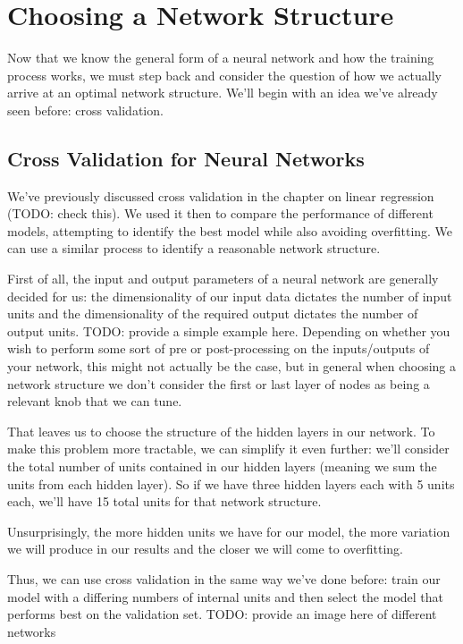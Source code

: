 \section{Choosing a Network Structure}
Now that we know the general form of a neural network and how the training process works, we must step back and consider the question of how we actually arrive at an optimal network structure. We'll begin with an idea we've already seen before: cross validation.

\subsection{Cross Validation for Neural Networks}
We've previously discussed cross validation in the chapter on linear regression (TODO: check this). We used it then to compare the performance of different models, attempting to identify the best model while also avoiding overfitting. We can use a similar process to identify a reasonable network structure.

First of all, the input and output parameters of a neural network are generally decided for us: the dimensionality of our input data dictates the number of input units and the dimensionality of the required output dictates the number of output units. TODO: provide a simple example here. Depending on whether you wish to perform some sort of pre or post-processing on the inputs/outputs of your network, this might not actually be the case, but in general when choosing a network structure we don't consider the first or last layer of nodes as being a relevant knob that we can tune.

That leaves us to choose the structure of the hidden layers in our network. To make this problem more tractable, we can simplify it even further: we'll consider the total number of units contained in our hidden layers (meaning we sum the units from each hidden layer). So if we have three hidden layers each with 5 units each, we'll have 15 total units for that network structure.

Unsurprisingly, the more hidden units we have for our model, the more variation we will produce in our results and the closer we will come to overfitting.

Thus, we can use cross validation in the same way we've done before: train our model with a differing numbers of internal units and then select the model that performs best on the validation set. TODO: provide an image here of different networks


